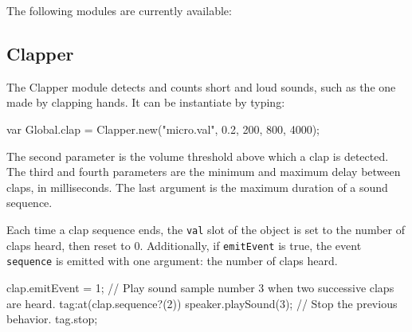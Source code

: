 The following modules are currently available:

\subsection{Clapper}

The Clapper module detects and counts short and loud sounds, such as the one
made by clapping  hands. It can be instantiate by typing:

\begin{urbiunchecked}
var Global.clap = Clapper.new("micro.val", 0.2, 200, 800, 4000);
\end{urbiunchecked}

The second parameter is the volume threshold above which a clap is detected.
The third and fourth parameters are the minimum and maximum delay between claps,
in milliseconds. The last argument is the maximum duration of a sound sequence.

Each time a clap sequence ends, the \lstinline|val| slot of the object is
set to the number of claps heard, then reset to 0.
Additionally, if \lstinline|emitEvent| is true, the event \lstinline|sequence|
is emitted with one argument: the number of claps heard.

\begin{urbiunchecked}
clap.emitEvent = 1;
// Play sound sample number 3 when two successive claps are heard.
tag:at(clap.sequence?(2)) speaker.playSound(3);
// Stop the previous behavior.
tag.stop;
\end{urbiunchecked}


